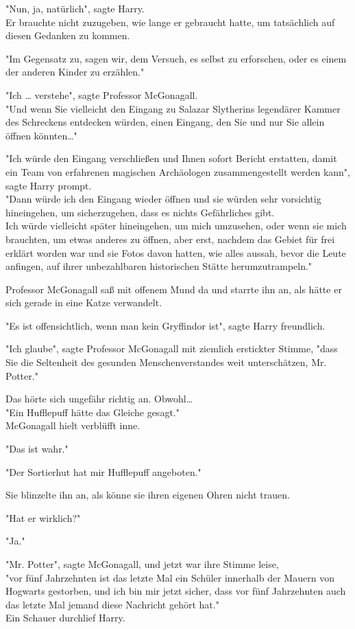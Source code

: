 {"Nun, ja, natürlich", sagte Harry.\\ Er brauchte nicht zuzugeben, wie lange er gebraucht hatte, um tatsächlich auf diesen Gedanken zu kommen.

"Im Gegensatz zu, sagen wir, dem Versuch, es selbst zu erforschen, oder es einem der anderen Kinder zu erzählen."

"Ich … verstehe", sagte Professor McGonagall.\\ "Und wenn Sie vielleicht den Eingang zu Salazar Slytherins legendärer Kammer des Schreckens entdecken würden, einen Eingang, den Sie und nur Sie allein öffnen könnten…"

"Ich würde den Eingang verschließen und Ihnen sofort Bericht erstatten, damit ein Team von erfahrenen magischen Archäologen zusammengestellt werden kann", sagte Harry prompt.\\ "Dann würde ich den Eingang wieder öffnen und sie würden sehr vorsichtig hineingehen, um sicherzugehen, dass es nichts Gefährliches gibt.\\ Ich würde vielleicht später hineingehen, um mich umzusehen, oder wenn sie mich brauchten, um etwas anderes zu öffnen, aber erst, nachdem das Gebiet für frei erklärt worden war und sie Fotos davon hatten, wie alles aussah, bevor die Leute anfingen, auf ihrer unbezahlbaren historischen Stätte herumzutrampeln."

Professor McGonagall saß mit offenem Mund da und starrte ihn an, als hätte er sich gerade in eine Katze verwandelt.

"Es ist offensichtlich, wenn man kein Gryffindor ist", sagte Harry freundlich.

"Ich glaube", sagte Professor McGonagall mit ziemlich erstickter Stimme, "dass Sie die Seltenheit des gesunden Menschenverstandes weit unterschätzen, Mr. Potter."

Das hörte sich ungefähr richtig an. Obwohl…\\ "Ein Hufflepuff hätte das Gleiche gesagt."\\ McGonagall hielt verblüfft inne.

"Das ist wahr."

"Der Sortierhut hat mir Hufflepuff angeboten."

Sie blinzelte ihn an, als könne sie ihren eigenen Ohren nicht trauen.

"Hat er wirklich?"

"Ja."

"Mr. Potter", sagte McGonagall, und jetzt war ihre Stimme leise,\\ "vor fünf Jahrzehnten ist das letzte Mal ein Schüler innerhalb der Mauern von Hogwarts gestorben, und ich bin mir jetzt sicher, dass vor fünf Jahrzehnten auch das letzte Mal jemand diese Nachricht gehört hat."\\ Ein Schauer durchlief Harry.

}
